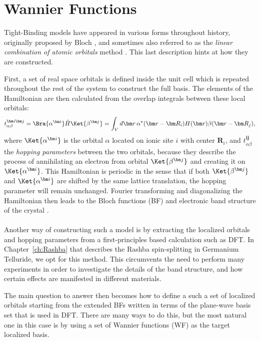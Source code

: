 \chapter{Wannier Functions \label{sec:Wannier}}
Tight-Binding models have appeared in various forms throughout history, originally proposed by Bloch \cite{Bloch1929}, and sometimes also referred to as the {\it linear combination of atomic orbitals} method \cite{Slater1954}.
This last description hints at how they are constructed.

First, a set of real space orbitals is defined inside the unit cell which is repeated throughout the rest of the system to construct the full basis.
The elements of the Hamiltonian are then calculated from the overlap integrals between these local orbitals:
\begin{equation}
	t^{\bm i \bm j}_{\alpha \beta} = \Bra{\alpha^{\bm i}} \hat{H} \Ket{\beta^{\bm j}} = \int_{V} d\bm r\, \alpha^*(\bm r - \bm R_i) H(\bm r) \beta(\bm r - \bm R_j),
\end{equation}
where $\Ket{\alpha^{\bm i}}$ is the orbital $\alpha$ located on ionic site $i$ with center $\bm R_i$, and $t^{\bm i \bm j}_{\alpha \beta}$ the {\it hopping parameters} between the two orbitals, because they describe the process of annihilating an electron from orbital $\Ket{\beta^{\bm j}}$ and creating it on $\Ket{\alpha^{\bm i}}$.
This Hamiltonian is periodic in the sense that if both $\Ket{\beta^{\bm j}}$ and $\Ket{\alpha^{\bm i}}$ are shifted by the same lattice translation, the hopping parameter will remain unchanged.
Fourier transforming and diagonalizing the Hamiltonian then leads to the Bloch functions (BF) and electronic band structure of the crystal \cite{Ashcroft}.
\\\\
Another way of constructing such a model is by extracting the localized orbitals and hopping parameters from a first-principles based calculation such as DFT. In Chapter~\ref{ch:Rashba} that describes the Rashba spin-splitting in Germanium Telluride, we opt for this method.
This circumvents the need to perform many experiments in order to investigate the details of the band structure, and how certain effects are manifested in different materials. 

The main question to answer then becomes how to define a such a set of localized orbitals starting from the extended BFs written in terms of the plane-wave basis set that is used in DFT.
There are many ways to do this, but the most natural one in this case is by using a set of Wannier functions (WF) \cite{Wannier1937} as the target localized basis.

